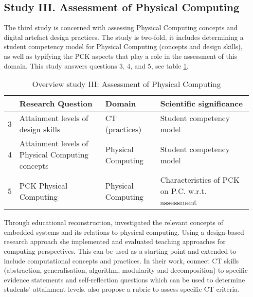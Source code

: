 


\subsection{Study III. Assessment of Physical Computing} %

The third study is concerned with assessing Physical Computing concepts and digital artefact design practices. The study is two-fold, it includes determining a student competency model for Physical Computing (concepts and design skills), as well as typifying the PCK aspects that play a role in the assessment of this domain. This study answers questions 3, 4, and 5, see table \ref{table:StudyIIIresearchQues}.

\begin{table}
  \centering
\begin{tabular}{|c|p{50mm}|l|p{48mm}|}
   \hline
    &\textbf{Research Question} & \textbf{Domain} & \textbf{Scientific significance}\\
  \hline

  3 & Attainment levels of design skills & CT (practices) & Student competency model  \\ \hline
  4 & Attainment levels of Physical Computing concepts & Physical Computing & Student competency model\\ \hline
  5 & PCK Physical Computing & Physical Computing & Characteristics of PCK on P.C. w.r.t. assessment\\
  \hline
\end{tabular}
\caption{Overview study III: Assessment of Physical Computing}\label{table:StudyIIIresearchQues}
\end{table}



Through educational reconstruction, \citeauthor{mareen2018PhysComp} investigated the relevant concepts of embedded systems and its relations to physical computing. Using a design-based research approach she implemented and evaluated teaching approaches for computing perspectives. This can be used as a starting point and extended to include computational concepts and practices. In their work, \citeauthor{atmatzidou2012evaluating} connect CT skills (abstraction, generalisation, algorithm, modularity and decomposition) to specific evidence statements and self-reflection questions which can be used to determine students' attainment levels. \citeauthor{atmatzidou2012evaluating} also propose a rubric to assess specific CT criteria.


